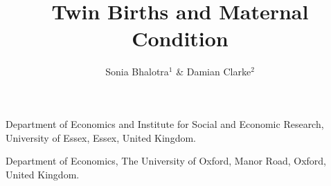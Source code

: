 \documentclass{nature}
\title{Twin Births and Maternal Condition}
\author{Sonia Bhalotra$^{1}$ \& Damian Clarke$^2$}
\begin{document}
\maketitle

\begin{affiliations}
 \item Department of Economics and Institute for Social and Economic Research, University of Essex, Essex, United Kingdom.
 \item Department of Economics, The University of Oxford, Manor Road, Oxford, United Kingdom.
\end{affiliations}

\begin{linenumbers}  
\begin{abstract}
  

\end{abstract}
\end{linenumbers}
\end{document}
